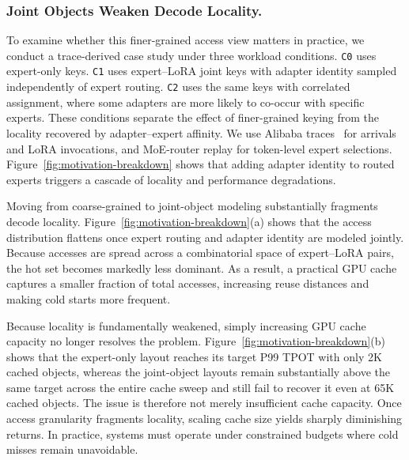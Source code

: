 \documentclass[sigplan,anonymous,review,10pt]{acmart}
\begin{document}
\subsubsection{Joint Objects Weaken Decode Locality.}
\label{subsec:case-study}

To examine whether this finer-grained access view matters in practice, we conduct a trace-derived case study under three workload conditions. \texttt{C0} uses expert-only keys. 
\texttt{C1} uses expert--LoRA joint keys with adapter identity sampled independently of expert routing. \texttt{C2} uses the same keys with correlated assignment, where some adapters are more likely to co-occur with specific experts. These conditions separate the effect of finer-grained keying from the locality recovered by adapter--expert affinity. We use Alibaba traces~\cite{yan2026FlexPipe} for arrivals and LoRA invocations, and MoE-router replay for token-level expert selections. Figure~\ref{fig:motivation-breakdown} shows that adding adapter identity to routed experts triggers a cascade of locality and performance degradations.


Moving from coarse-grained to joint-object modeling substantially fragments decode locality. Figure~\ref{fig:motivation-breakdown}(a) shows that the access distribution flattens once expert routing and adapter identity are modeled jointly. Because accesses are spread across a combinatorial space of expert--LoRA pairs, the hot set becomes markedly less dominant. As a result, a practical GPU cache captures a smaller fraction of total accesses, increasing reuse distances and making cold starts more frequent.

Because locality is fundamentally weakened, simply increasing GPU cache capacity no longer resolves the problem. Figure~\ref{fig:motivation-breakdown}(b) shows that the expert-only layout reaches its target P99 TPOT with only 2K cached objects, whereas the joint-object layouts remain substantially above the same target across the entire cache sweep and still fail to recover it even at 65K cached objects. The issue is therefore not merely insufficient cache capacity. Once access granularity fragments locality, scaling cache size yields sharply diminishing returns. In practice, systems must operate under constrained budgets where cold misses remain unavoidable.
\end{document}
